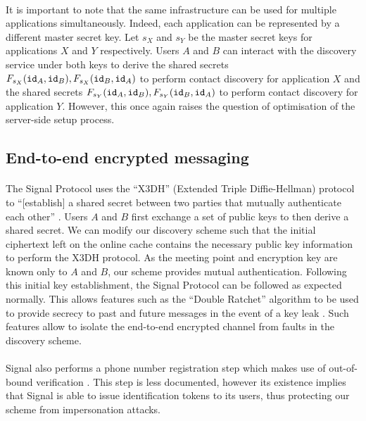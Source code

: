 \paragraph{} It is important to note that the same infrastructure can be used for multiple applications simultaneously. Indeed, each application can be represented by a different master secret key. Let $s_X$ and $s_Y$ be the master secret keys for applications $X$ and $Y$ respectively. Users $A$ and $B$ can interact with the discovery service under both keys to derive the shared secrets $F_{s_X}(\mathtt{id}_A, \mathtt{id}_B), F_{s_X}(\mathtt{id}_B, \mathtt{id}_A)$ to perform contact discovery for application $X$ and the shared secrets $F_{s_Y}(\mathtt{id}_A, \mathtt{id}_B), F_{s_Y}(\mathtt{id}_B, \mathtt{id}_A)$ to perform contact discovery for application $Y$. However, this once again raises the question of optimisation of the server-side setup process.

	\subsection{End-to-end encrypted messaging}
	
	\paragraph{} The Signal Protocol uses the ``X3DH'' (Extended Triple Diffie-Hellman) protocol to ``[establish] a shared secret between two parties that mutually authenticate each other'' \cite{Signal:X3DH}. Users $A$ and $B$ first exchange a set of public keys to then derive a shared secret. We can modify our discovery scheme such that the initial ciphertext left on the online cache contains the necessary public key information to perform the X3DH protocol. As the meeting point and encryption key are known only to $A$ and $B$, our scheme provides mutual authentication. Following this initial key establishment, the Signal Protocol can be followed as expected normally. This allows features such as the ``Double Ratchet'' algorithm to be used to provide secrecy to past and future messages in the event of a key leak \cite{Signal:Ratchet}. Such features allow to isolate the end-to-end encrypted channel from faults in the discovery scheme.
	
	\paragraph{} Signal also performs a phone number registration step which makes use of out-of-bound verification \cite{Signal:Reg}. This step is less documented, however its existence implies that Signal is able to issue identification tokens to its users, thus protecting our scheme from impersonation attacks. 
	
